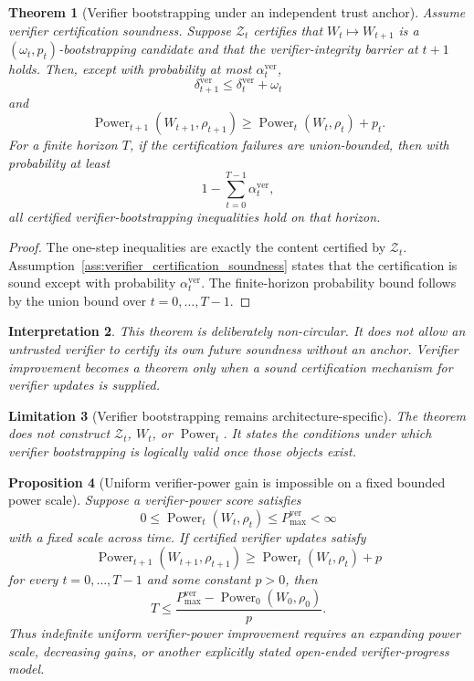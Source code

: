 \documentclass[11pt]{article}
\newtheorem{theorem}{Theorem}[section]
\newtheorem{proposition}[theorem]{Proposition}
\newtheorem{interpretation}[theorem]{Interpretation}
\newtheorem{limitation}[theorem]{Limitation}
\newcommand{\1}{\mathbf{1}}
\providecommand{\Zcal}{\mathcal{Z}}
\providecommand{\ver}{\mathrm{ver}}
\providecommand{\Power}{\operatorname{Power}}
\begin{document}
\begin{theorem}[Verifier bootstrapping under an independent trust anchor]
\label{thm:verifier_bootstrapping}
Assume verifier certification soundness.  Suppose \(\Zcal_t\) certifies that \(W_t\mapsto W_{t+1}\) is a \((\omega_t,p_t)\)-bootstrapping candidate and that the verifier-integrity barrier at \(t+1\) holds.  Then, except with probability at most \(\alpha^{\ver}_t\),
\[
\delta^{\ver}_{t+1}\le\delta^{\ver}_t+\omega_t
\]
and
\[
\Power_{t+1}(W_{t+1},\rho_{t+1})
\ge
\Power_t(W_t,\rho_t)+p_t.
\]
For a finite horizon \(T\), if the certification failures are union-bounded, then with probability at least
\[
1-\sum_{t=0}^{T-1}\alpha^{\ver}_t,
\]
all certified verifier-bootstrapping inequalities hold on that horizon.
\end{theorem}

\begin{proof}
The one-step inequalities are exactly the content certified by \(\Zcal_t\).  Assumption~\ref{ass:verifier_certification_soundness} states that the certification is sound except with probability \(\alpha^{\ver}_t\).  The finite-horizon probability bound follows by the union bound over \(t=0,\dots,T-1\).
\end{proof}

\begin{interpretation}
This theorem is deliberately non-circular.  It does not allow an untrusted verifier to certify its own future soundness without an anchor.  Verifier improvement becomes a theorem only when a sound certification mechanism for verifier updates is supplied.
\end{interpretation}

\begin{limitation}[Verifier bootstrapping remains architecture-specific]
The theorem does not construct \(\Zcal_t\), \(W_t\), or \(\Power_t\).  It states the conditions under which verifier bootstrapping is logically valid once those objects exist.
\end{limitation}

\begin{proposition}[Uniform verifier-power gain is impossible on a fixed bounded power scale]
\label{prop:bounded_verifier_power_gain_impossible}
Suppose a verifier-power score satisfies
\[
0\le\Power_t(W_t,\rho_t)\le P_{\max}^{\ver}<\infty
\]
with a fixed scale across time.  If certified verifier updates satisfy
\[
\Power_{t+1}(W_{t+1},\rho_{t+1})
\ge
\Power_t(W_t,\rho_t)+p
\]
for every \(t=0,\dots,T-1\) and some constant \(p>0\), then
\[
T\le\frac{P_{\max}^{\ver}-\Power_0(W_0,\rho_0)}{p}.
\]
Thus indefinite uniform verifier-power improvement requires an expanding power scale, decreasing gains, or another explicitly stated open-ended verifier-progress model.
\end{proposition}
\end{document}
